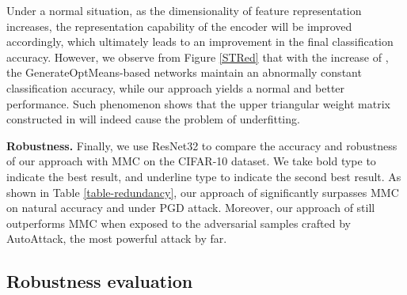 \documentclass[preprint,review,12pt]{elsarticle}
\numberwithin{equation}{section}
\begin{document}
Under a normal situation,
as the dimensionality of feature representation increases,
the representation capability of the encoder will be improved accordingly,
which ultimately leads to an improvement in the final classification accuracy.
However, we observe from Figure \ref{STRed} that  with the increase of  ,
the GenerateOptMeans-based networks maintain an abnormally constant classification accuracy,
while our approach yields a normal and better performance.
Such phenomenon shows that the upper triangular weight matrix constructed in \cite{pang2018,pang2020}
will indeed cause the problem of underfitting.



\begin{table}[!htb]
	\center
	\caption{Comparison of classification accuracy (\%) between MMC and the proposed method on CIFAR-10.
		We directly cite the * results of MMC from RobustBench \cite{croce2020b} and others from the original paper.
	}
	\label{table-redundancy}
\end{table}



\textbf{Robustness.} Finally, we use ResNet32 to compare the  accuracy and robustness of our approach with MMC \cite{pang2020} on the CIFAR-10 dataset.
We take bold type to indicate the best result, and underline type to indicate the second best result.
As shown in Table \ref{table-redundancy},
our approach of  significantly surpasses MMC on natural accuracy and under PGD attack.
Moreover, our approach of  still outperforms MMC
when exposed to the adversarial samples crafted by AutoAttack, the most powerful attack by far.


\subsection{Robustness evaluation}
\end{document}
